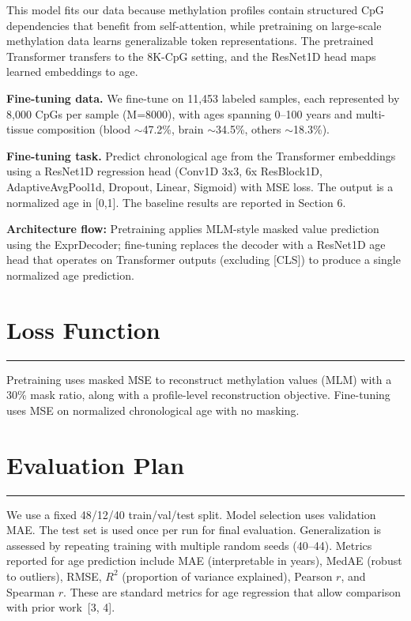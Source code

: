 \documentclass[11pt]{article}
\begin{document}
\noindent This model fits our data because methylation profiles contain structured CpG dependencies that benefit from self-attention, while pretraining on large-scale methylation data learns generalizable token representations. The pretrained Transformer transfers to the 8K-CpG setting, and the ResNet1D head maps learned embeddings to age.

\noindent \textbf{Fine-tuning data.} We fine-tune on 11,453 labeled samples, each represented by 8,000 CpGs per sample (M=8000), with ages spanning 0--100 years and multi-tissue composition (blood $\sim$47.2\%, brain $\sim$34.5\%, others $\sim$18.3\%).

\noindent \textbf{Fine-tuning task.} Predict chronological age from the Transformer embeddings using a ResNet1D regression head (Conv1D 3x3, 6x ResBlock1D, AdaptiveAvgPool1d, Dropout, Linear, Sigmoid) with MSE loss. The output is a normalized age in [0,1]. The baseline results are reported in Section 6.

\noindent \textbf{Architecture flow:} Pretraining applies MLM-style masked value prediction using the ExprDecoder; fine-tuning replaces the decoder with a ResNet1D age head that operates on Transformer outputs (excluding [CLS]) to produce a single normalized age prediction.

\section{Loss Function}
\vspace{-0.3em}
\hrule
\vspace{0.8em}
Pretraining uses masked MSE to reconstruct methylation values (MLM) with a 30\% mask ratio, along with a profile-level reconstruction objective. Fine-tuning uses MSE on normalized chronological age with no masking.

\section{Evaluation Plan}
\vspace{-0.3em}
\hrule
\vspace{0.8em}
We use a fixed 48/12/40 train/val/test split. Model selection uses validation MAE. The test set is used once per run for final evaluation. Generalization is assessed by repeating training with multiple random seeds (40--44). Metrics reported for age prediction include MAE (interpretable in years), MedAE (robust to outliers), RMSE, $R^2$ (proportion of variance explained), Pearson $r$, and Spearman $r$. These are standard metrics for age regression that allow comparison with prior work~[3, 4].
\end{document}
